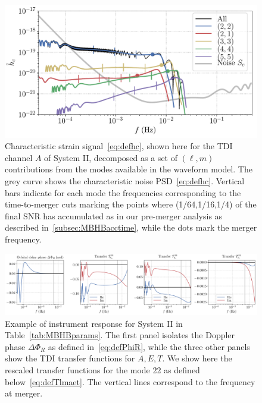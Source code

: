\documentclass[aps,showpacs,twocolumn,prd,superscriptaddress,nofootinbib]{revtex4-1}
\begin{document}
\begin{figure}
  \centering
  \includegraphics[width=.99\linewidth]{plot_hc_tdia_hm.pdf}
  \caption{Characteristic strain signal~\eqref{eq:defhc}, shown here for the TDI channel $A$ of System II, decomposed as a set of $(\ell,m)$ contributions from the modes available in the waveform model. The grey curve shows the characteristic noise PSD~\eqref{eq:defhc}. Vertical bars indicate for each mode the frequencies corresponding to the time-to-merger cuts marking the points where (1/64,1/16,1/4) of the final SNR has accumulated as in our pre-merger analysis as described in~\ref{subsec:MBHBacctime}, while the dots mark the merger frequency.}
  \label{fig:hctdiahm}
\end{figure}

\begin{figure}
  \centering
  \includegraphics[width=.98\linewidth]{plot_smbh9_tdi.pdf}
  \caption{Example of instrument response for System II in Table~\ref{tab:MBHBparams}. The first panel isolates the Doppler phase $\Delta\Phi_{R}$ as defined in~\eqref{eq:defPhiR}, while the three other panels show the TDI transfer functions for $A,E,T$. We show here the rescaled transfer functions for the mode 22 as defined below~\eqref{eq:defTlmaet}. The vertical lines correspond to the frequency at merger.}
  \label{fig:tranferSMBHCase9}
\end{figure}
\end{document}
